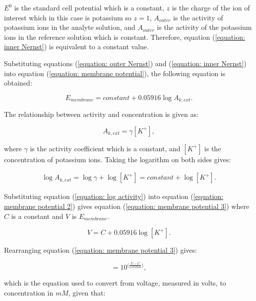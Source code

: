 \noindent $E^{0}$ is the standard cell potential which is a constant, $z$ is the charge of the ion of interest which in this case is potassium so $z=1$, $A_{outer}$ is the activity of potassium ions in the analyte solution, and $A_{outer}$ is the activity of the potassium ions in the reference solution which is constant. Therefore, equation (\ref{equation: inner Nernst}) is equivalent to a constant value.

Substituting equations (\ref{equation: outer Nernst}) and (\ref{equation: inner Nernst}) into equation (\ref{equation: membrane potential}), the following equation is obtained:

\begin{equation}
    E_{membrane} = constant + 0.05916\log A_{k,ext}.
    \label{equation: membrane potential 2}
\end{equation}

The relationship between activity and concentration is given as:

\begin{equation}
    A_{k,ext} = \gamma [K^{+}],
    \label{equation: activity}
\end{equation}

\noindent where $\gamma$ is the activity coefficient which is a constant, and $[K^{+}]$ is the concentration of potassium ions. Taking the logarithm on both sides gives:

\begin{align}
    \log A_{k,ext} = \log\gamma + \log [K^{+}] = constant + \log [K^{+}].
    \label{equation: log activity}
\end{align}

Substituting equation (\ref{equation: log activity}) into equation (\ref{equation: membrane potential 2}) gives equation (\ref{equation: membrane potential 3}) where $C$ is a constant and $V$ is $E_{membrane}$.

\begin{equation}
    V = C + 0.05916 \log [K^{+}].
    \label{equation: membrane potential 3}
\end{equation}

\noindent Rearranging equation (\ref{equation: membrane potential 3}) gives:

\begin{equation}
    [K^{+}] = 10^{\big(\frac{V-C}{0.05916}\big)},
    \label{equation: K+ calibration}
\end{equation}

\noindent which is the equation used to convert from voltage, measured in volts, to concentration in $mM$, given that:

